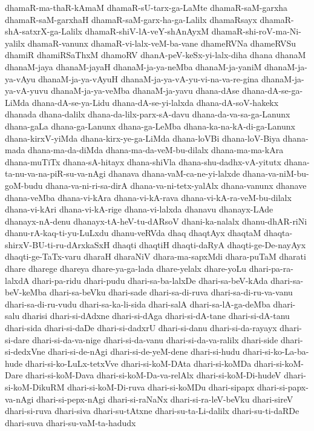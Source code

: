 {dhamaR-ma-thaR-kAmaM
dhamaR-sU-tarx-ga-LaMte
dhamaR-saM-garxha
dhamaR-saM-garxhaH
dhamaR-saM-garx-ha-ga-Lalilx
dhamaRsayx
dhamaR-shA-satxrX-ga-Lalilx
dhamaR-shiV-lA-veY-shAnAyxM
dhamaR-shi-roV-ma-Ni-yalilx
dhamaR-vanunx
dhamaR-vi-lalx-veM-ba-vane
dhameRVNa
dhameRVSu
dhamiR
dhamiRSaThxM
dhamoRV
dhanA-peV-keSx-yi-lalx-diha
dhana
dhanaM
dhanaM-jaya
dhanaM-jayaH
dhanaM-ja-ya-neMba
dhanaM-ja-yaniM
dhanaM-ja-ya-vAyu
dhanaM-ja-ya-vAyuH
dhanaM-ja-ya-vA-yu-vi-na-va-re-gina
dhanaM-ja-ya-vA-yuvu
dhanaM-ja-ya-veMba
dhanaM-ja-yavu
dhana-dAse
dhana-dA-se-ga-LiMda
dhana-dA-se-ya-Lidu
dhana-dA-se-yi-lalxda
dhana-dA-soV-hakekx
dhanada
dhana-dalilx
dhana-da-lilx-parx-sA-davu
dhana-da-va-sa-ga-Lanunx
dhana-gaLa
dhana-ga-Lanunx
dhana-ga-LeMba
dhana-ka-na-kA-di-ga-Lanunx
dhana-kirxV-yiMda
dhana-kirx-ye-ga-LiMda
dhana-loVBi
dhana-loV-Biya
dhana-mada
dhana-ma-da-diMda
dhana-ma-da-veM-bu-dilalx
dhana-ma-ma-kAra
dhana-muTiTx
dhana-sA-hitayx
dhana-shiVla
dhana-shu-dadhx-vA-yitutx
dhana-ta-nu-va-na-piR-su-va-nAgi
dhanava
dhana-vaM-ca-ne-yi-lalxde
dhana-va-niM-bu-goM-budu
dhana-va-ni-ri-sa-dirA
dhana-va-ni-tetx-yalAlx
dhana-vanunx
dhanave
dhana-veMba
dhana-vi-kAra
dhana-vi-kA-rava
dhana-vi-kA-ra-veM-bu-dilalx
dhana-vi-kAri
dhana-vi-kA-rige
dhana-vi-lalxda
dhanavu
dhanayx-LAde
dhanayx-nA-denu
dhanayx-tA-heV-tu-dARsoV
dhani-ka-nalalx
dhanu-dhAR-riNi
dhanu-rA-kaq-ti-yu-LuLxdu
dhanu-veRVda
dhaq
dhaqtAyx
dhaqtaM
dhaqta-shirxV-BU-ti-ru-dArxkaSxH
dhaqti
dhaqtiH
dhaqti-daRyA
dhaqti-ge-De-nayAyx
dhaqti-ge-TaTx-varu
dharaH
dharaNiV
dhara-ma-sapxMdi
dhara-puTaM
dharati
dhare
dharege
dhareya
dhare-ya-ga-lada
dhare-yelalx
dhare-yoLu
dhari-pa-ra-lalxdA
dhari-pa-ridu
dhari-pudu
dhari-sa-ba-lalxDe
dhari-sa-beV-kAda
dhari-sa-beV-keMba
dhari-sa-beVku
dhari-sade
dhari-sa-di-ruva
dhari-sa-di-ru-va-vanu
dhari-sa-di-ru-vudu
dhari-sa-ka-li-sida
dhari-salA
dhari-sa-lA-ga-deMba
dhari-salu
dharisi
dhari-si-dAdxne
dhari-si-dAga
dhari-si-dA-tane
dhari-si-dA-tanu
dhari-sida
dhari-si-daDe
dhari-si-dadxrU
dhari-si-danu
dhari-si-da-rayayx
dhari-si-dare
dhari-si-da-va-nige
dhari-si-da-vanu
dhari-si-da-va-ralilx
dhari-side
dhari-si-dedxVne
dhari-si-de-nAgi
dhari-si-de-yeM-dene
dhari-si-hudu
dhari-si-ko-La-ba-hude
dhari-si-ko-LuLx-tetxVve
dhari-si-koM-DAta
dhari-si-koMDa
dhari-si-koM-Dare
dhari-si-koM-Dava
dhari-si-koM-Da-va-relAlx
dhari-si-koM-Di-hudeV
dhari-si-koM-DikuRM
dhari-si-koM-Di-ruva
dhari-si-koMDu
dhari-sipapx
dhari-si-papx-va-nAgi
dhari-si-pepx-nAgi
dhari-si-raNaNx
dhari-si-ra-leV-beVku
dhari-sireV
dhari-si-ruva
dhari-siva
dhari-su-tAtxne
dhari-su-ta-Li-dalilx
dhari-su-ti-daRDe
dhari-suva
dhari-su-vaM-ta-hadudx
}
